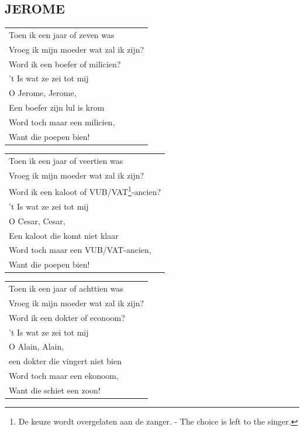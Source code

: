 \documentclass[a4paper, 14pt]{extarticle}
\begin{document}
\subsection*{JEROME}
\begin{flushleft}
\begin{tabularx}{0.8\textwidth} {
   >{\raggedright\arraybackslash}X}
   Toen ik een jaar of zeven was\\
Vroeg ik mijn moeder wat zal ik zijn?\\
Word ik een boefer of milicien?\\
’t Is wat ze zei tot mij\\
O Jerome, Jerome,\\
Een boefer zijn lul is krom\\
Word toch maar een milicien,\\
Want die poepen bien!\\
\end{tabularx}
\end{flushleft}\begin{flushleft}
\begin{tabularx}{0.8\textwidth} {
   >{\raggedright\arraybackslash}X}
Toen ik een jaar of veertien was\\
Vroeg ik mijn moeder wat zal ik zijn?\\
Word ik een kaloot of VUB/VAT\footnote{De keuze wordt overgelaten aan de zanger. - The choice is left to the singer.}-ancien?\\
’t Is wat ze zei tot mij\\
O Cesar, Cesar,\\
Een kaloot die komt niet klaar\\
Word toch maar een VUB/VAT\footnotemark[2]-ancien,\\
Want die poepen bien!\\
\end{tabularx}
\end{flushleft}\begin{flushleft}
\begin{tabularx}{0.8\textwidth} {
   >{\raggedright\arraybackslash}X}
Toen ik een jaar of achttien was\\
Vroeg ik mijn moeder wat zal ik zijn?\\
Word ik een dokter of econoom?\\
’t Is wat ze zei tot mij\\
O Alain, Alain,\\
een dokter die vingert niet bien\\
Word toch maar een ekonoom,\\
Want die schiet een zoon!\\
\end{tabularx}
\end{flushleft}
\end{document}
